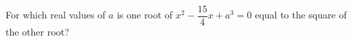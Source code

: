 For which real values of $a$ is one root of $x^2-\dfrac{15}{4}x+a^3=0$ equal to the square of the other root?
